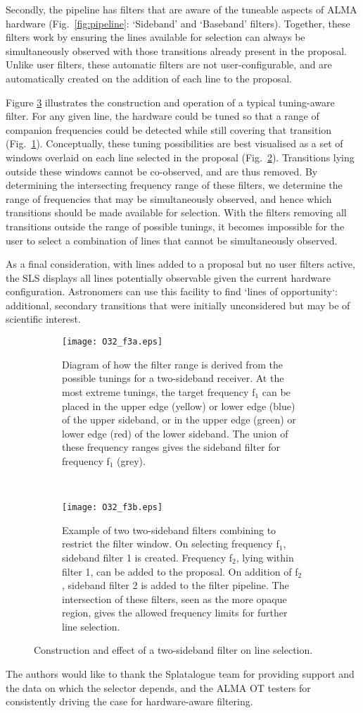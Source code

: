 \documentclass[11pt,twoside]{article}
\begin{document}
Secondly, the pipeline has filters that are aware of the tuneable aspects of ALMA hardware (Fig.~\ref{fig:pipeline}: `Sideband' and `Baseband' filters). Together, these filters work by ensuring the lines available for selection can always be simultaneously observed with those transitions already present in the proposal. Unlike user filters, these automatic filters are not user-configurable, and are automatically created on the addition of each line to the proposal. 

Figure \ref{fig:filter construction} illustrates the construction and operation of a typical tuning-aware filter. For any given line, the hardware could be tuned so that a range of companion frequencies could be detected while still covering that transition (Fig.~\ref{fig:filter union}). Conceptually, these tuning possibilities are best visualised as a set of windows overlaid on each line selected in the proposal (Fig.~\ref{fig:sidebands}). Transitions lying outside these windows cannot be co-observed, and are thus removed. By determining the intersecting frequency range of these filters, we determine the range of frequencies that may be simultaneously observed, and hence which transitions should be made available for selection. With the filters removing all transitions outside the range of possible tunings, it becomes impossible for the user to select a combination of lines that cannot be simultaneously observed.

As a final consideration, with lines added to a proposal but no user filters active, the SLS displays all lines potentially observable given the current hardware configuration. Astronomers can use this facility to find `lines of opportunity`: additional, secondary transitions that were initially unconsidered but may be of scientific interest.

\begin{figure}
\centering
\begin{subfigure}[b]{0.5\textwidth}
	\texttt{[image: O32\_f3a.eps]}
	\caption{Diagram of how the filter range is derived from the possible tunings for a two-sideband receiver. At the most extreme tunings, the target frequency f$_1$ can be placed in the upper edge (yellow) or lower edge (blue) of the upper sideband, or in the upper edge (green) or lower edge (red) of the lower sideband. The union of these frequency ranges gives the sideband filter for frequency f$_1$ (grey).}
	\label{fig:filter union}
\end{subfigure}%
~~
\begin{subfigure}[b]{0.5\textwidth}
	\centering
	\texttt{[image: O32\_f3b.eps]}
	\caption{Example of two two-sideband filters combining to restrict the filter window. On selecting frequency f$_1$, sideband filter 1 is created. Frequency f$_2$, lying within filter 1, can be added to the proposal. On addition of f$_2$, sideband filter 2 is added to the filter pipeline. The intersection of these filters, seen as the more opaque region, gives the allowed frequency limits for further line selection.}
	\label{fig:sidebands}
\end{subfigure}%
\caption{Construction and effect of a two-sideband filter on line selection.}
\label{fig:filter construction}
\end{figure}

\acknowledgements The authors would like to thank the Splatalogue team for providing support and the data on which the selector depends, and the ALMA OT testers for consistently driving the case for hardware-aware filtering.


\end{document}
